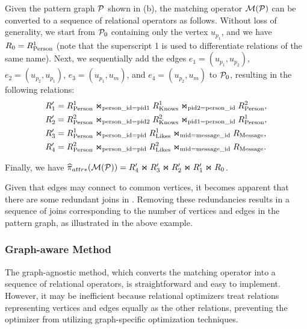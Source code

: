 \begin{example}
  Given the pattern graph $\mathcal{P}$ shown in (b), the matching operator $\mathcal{M}(\mathcal{P})$ can be converted to a sequence of relational operators as follows. Without loss of generality, we start from $\mathcal{P}_0$ containing only the vertex $u_{p_1}$, and we have ${R_{0}} = {R^{1}_{\text{Person}}}$ (note that the superscript 1 is used to differentiate relations of the same name).
  Next, we sequentially add the edges $e_1 = (u_{p_1}, u_{p_2})$, $e_2 = (u_{p_2}, u_{p_1})$, $e_3 = (u_{p_1}, u_m)$, and $e_4 = (u_{p_2}, u_m)$ to $\mathcal{P}_0$, resulting in the following relations:
  \begin{equation*}
    \begin{split}
    R'_1 &= {R^{1}_{\text{Person}}} \Join_{\text{person\_id}=\text{pid1}} {R^{1}_{\text{Knows}}} \Join_{\text{pid2}=\text{person\_id}} {R^{2}_{\text{Person}}}, \\
    R'_2 &= {R^{2}_{\text{Person}}} \Join_{\text{person\_id}=\text{pid2}} {R^{2}_{\text{Knows}}} \Join_{\text{pid1}=\text{person\_id}} {R^{1}_{\text{Person}}}, \\
    R'_3 &= {R^{1}_{\text{Person}}} \Join_{\text{person\_id}=\text{pid}} {R^{1}_{\text{Likes}}} \Join_{\text{mid}=\text{message\_id}} {R_{\text{Message}}}, \\
    R'_4 &= {R^{2}_{\text{Person}}} \Join_{\text{person\_id}=\text{pid}} {R^{2}_{\text{Likes}}} \Join_{\text{mid}=\text{message\_id}} {R_{\text{Message}}}.
    \end{split}
    \end{equation*}

    Finally, we have $\widehat{\pi}_{attr*}(\mathcal{M}(\mathcal{P})) = R'_4 \Join R'_3 \Join R'_2 \Join R'_1 \Join {\ensuremath R_{0}}$.

\end{example}

Given that edges may connect to common vertices, it becomes apparent that there are some redundant joins in . Removing these redundancies results in a sequence of joins corresponding to the number of vertices and edges in the pattern graph, as illustrated in the above example.

\subsubsection{Graph-aware Method}
\label{sec:graph-aware}
The graph-agnostic method, which converts the matching operator into a sequence of relational operators, is straightforward and easy to implement. However, it may be inefficient because relational optimizers treat relations representing vertices and edges equally as the other relations, preventing the optimizer from utilizing graph-specific optimization techniques. %

